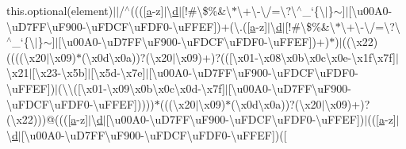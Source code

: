 \begin{DoxyCompactItemize}
this.\+optional(element)$\vert$$\vert$/$^\wedge$(((\mbox{[}\hyperlink{_scripts_2bootstrap_8min_8js_a7318f59fb86a4437995ee89c780c51ac}{a}-\/z\mbox{]}$\vert$\textbackslash{}\hyperlink{_scripts_2respond_8min_8js_aeb337d295abaddb5ec3cb34cc2e2bbc9}{d}$\vert$\mbox{[}!\#\textbackslash{}\$\%\&\textquotesingle{}\textbackslash{}$\ast$\textbackslash{}+\textbackslash{}-\/\textbackslash{}/=\textbackslash{}?\textbackslash{}$^\wedge$\+\_\+`\{\textbackslash{}$\vert$\}$\sim$\mbox{]}$\vert$\mbox{[}\textbackslash{}u00\+A0-\/\textbackslash{}u\+D7\+F\+F\textbackslash{}u\+F900-\/\textbackslash{}u\+F\+D\+C\+F\textbackslash{}u\+F\+D\+F0-\/\textbackslash{}u\+F\+F\+EF\mbox{]})+(\textbackslash{}.(\mbox{[}\hyperlink{_scripts_2bootstrap_8min_8js_a7318f59fb86a4437995ee89c780c51ac}{a}-\/z\mbox{]}$\vert$\textbackslash{}\hyperlink{_scripts_2respond_8min_8js_aeb337d295abaddb5ec3cb34cc2e2bbc9}{d}$\vert$\mbox{[}!\#\textbackslash{}\$\%\&\textquotesingle{}\textbackslash{}$\ast$\textbackslash{}+\textbackslash{}-\/\textbackslash{}/=\textbackslash{}?\textbackslash{}$^\wedge$\+\_\+`\{\textbackslash{}$\vert$\}$\sim$\mbox{]}$\vert$\mbox{[}\textbackslash{}u00\+A0-\/\textbackslash{}u\+D7\+F\+F\textbackslash{}u\+F900-\/\textbackslash{}u\+F\+D\+C\+F\textbackslash{}u\+F\+D\+F0-\/\textbackslash{}u\+F\+F\+EF\mbox{]})+)$\ast$)$\vert$((\textbackslash{}x22)((((\textbackslash{}x20$\vert$\textbackslash{}x09)$\ast$(\textbackslash{}x0d\textbackslash{}x0a))?(\textbackslash{}x20$\vert$\textbackslash{}x09)+)?((\mbox{[}\textbackslash{}x01-\/\textbackslash{}x08\textbackslash{}x0b\textbackslash{}x0c\textbackslash{}x0e-\/\textbackslash{}x1f\textbackslash{}x7f\mbox{]}$\vert$\textbackslash{}x21$\vert$\mbox{[}\textbackslash{}x23-\/\textbackslash{}x5b\mbox{]}$\vert$\mbox{[}\textbackslash{}x5d-\/\textbackslash{}x7e\mbox{]}$\vert$\mbox{[}\textbackslash{}u00\+A0-\/\textbackslash{}u\+D7\+F\+F\textbackslash{}u\+F900-\/\textbackslash{}u\+F\+D\+C\+F\textbackslash{}u\+F\+D\+F0-\/\textbackslash{}u\+F\+F\+EF\mbox{]})$\vert$(\textbackslash{}\textbackslash{}(\mbox{[}\textbackslash{}x01-\/\textbackslash{}x09\textbackslash{}x0b\textbackslash{}x0c\textbackslash{}x0d-\/\textbackslash{}x7f\mbox{]}$\vert$\mbox{[}\textbackslash{}u00\+A0-\/\textbackslash{}u\+D7\+F\+F\textbackslash{}u\+F900-\/\textbackslash{}u\+F\+D\+C\+F\textbackslash{}u\+F\+D\+F0-\/\textbackslash{}u\+F\+F\+EF\mbox{]}))))$\ast$(((\textbackslash{}x20$\vert$\textbackslash{}x09)$\ast$(\textbackslash{}x0d\textbackslash{}x0a))?(\textbackslash{}x20$\vert$\textbackslash{}x09)+)?(\textbackslash{}x22)))@(((\mbox{[}\hyperlink{_scripts_2bootstrap_8min_8js_a7318f59fb86a4437995ee89c780c51ac}{a}-\/z\mbox{]}$\vert$\textbackslash{}\hyperlink{_scripts_2respond_8min_8js_aeb337d295abaddb5ec3cb34cc2e2bbc9}{d}$\vert$\mbox{[}\textbackslash{}u00\+A0-\/\textbackslash{}u\+D7\+F\+F\textbackslash{}u\+F900-\/\textbackslash{}u\+F\+D\+C\+F\textbackslash{}u\+F\+D\+F0-\/\textbackslash{}u\+F\+F\+EF\mbox{]})$\vert$((\mbox{[}\hyperlink{_scripts_2bootstrap_8min_8js_a7318f59fb86a4437995ee89c780c51ac}{a}-\/z\mbox{]}$\vert$\textbackslash{}\hyperlink{_scripts_2respond_8min_8js_aeb337d295abaddb5ec3cb34cc2e2bbc9}{d}$\vert$\mbox{[}\textbackslash{}u00\+A0-\/\textbackslash{}u\+D7\+F\+F\textbackslash{}u\+F900-\/\textbackslash{}u\+F\+D\+C\+F\textbackslash{}u\+F\+D\+F0-\/\textbackslash{}u\+F\+F\+EF\mbox{]})(\mbox{[}\
\end{DoxyCompactItemize}
